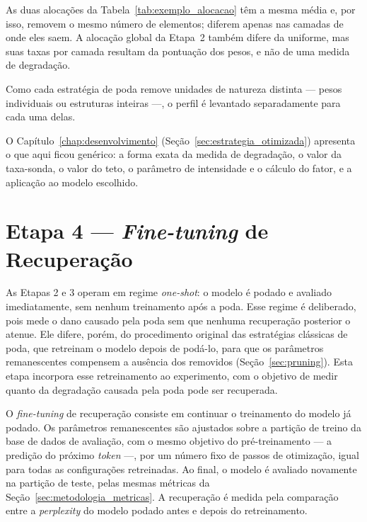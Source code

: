 As duas alocações da Tabela~\ref{tab:exemplo_alocacao} têm a mesma média e, por isso,
removem o mesmo número de elementos; diferem apenas nas camadas de onde eles saem. A
alocação global da Etapa~2 também difere da uniforme, mas suas taxas por camada resultam da
pontuação dos pesos, e não de uma medida de degradação.

Como cada estratégia de poda remove unidades de natureza distinta --- pesos individuais ou
estruturas inteiras ---, o perfil é levantado separadamente para cada uma delas.

O Capítulo~\ref{chap:desenvolvimento} (Seção~\ref{sec:estrategia_otimizada}) apresenta o
que aqui ficou genérico: a forma exata da medida de degradação, o valor da taxa-sonda, o
valor do teto, o parâmetro de intensidade e o cálculo do fator, e a aplicação ao modelo
escolhido.

\section{Etapa 4 --- \textit{Fine-tuning} de Recuperação}\label{sec:metodologia_finetuning}

As Etapas 2 e 3 operam em regime \textit{one-shot}: o modelo é podado e avaliado
imediatamente, sem nenhum treinamento após a poda. Esse regime é deliberado, pois mede o
dano causado pela poda sem que nenhuma recuperação posterior o atenue. Ele difere, porém,
do procedimento original das estratégias clássicas de poda, que retreinam o modelo depois
de podá-lo, para que os parâmetros remanescentes compensem a ausência dos removidos
\cite{Han2015,Li2017} (Seção~\ref{sec:pruning}). Esta etapa
incorpora esse retreinamento ao experimento, com o objetivo de medir quanto da degradação
causada pela poda pode ser recuperada.

O \textit{fine-tuning} de recuperação consiste em continuar o treinamento do modelo já
podado. Os parâmetros remanescentes são ajustados sobre a partição de treino da base de dados
de avaliação, com o mesmo objetivo do pré-treinamento --- a predição do próximo
\textit{token} ---, por um número fixo de passos de otimização, igual para todas as
configurações retreinadas. Ao final, o modelo é avaliado novamente na partição de teste,
pelas mesmas métricas da Seção~\ref{sec:metodologia_metricas}. A recuperação é medida pela
comparação entre a \textit{perplexity} do modelo podado antes e depois do retreinamento.

